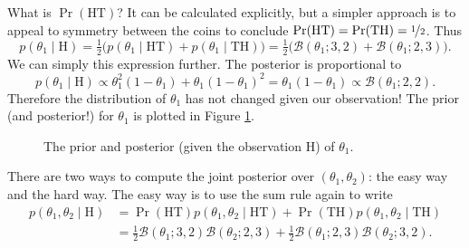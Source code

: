 \documentclass{article}
\newcommand{\given}{\mid}
\newcommand{\mc}[1]{\mathcal{#1}}
\begin{document}
What is $\Pr(\text{HT})$?  It can be calculated explicitly, but a
simpler approach is to appeal to symmetry between the coins to
conclude $\Pr(\text{HT}) = \Pr(\text{TH}) = \nicefrac{1}{2}$.  Thus
\begin{equation*}
  p(\theta_1 \given \text{H})
  =
  \tfrac{1}{2}
  \bigl(
  p(\theta_1 \given \text{HT}) +
  p(\theta_1 \given \text{TH})
  \bigr)
  =
  \tfrac{1}{2}
  \bigl(
  \mc{B}(\theta_1; 3, 2) +
  \mc{B}(\theta_1; 2, 3)
  \bigr)
  .
\end{equation*}
We can simply this expression further.  The posterior is proportional
to
\begin{equation*}
  p(\theta_1 \given \text{H})
  \propto
  \theta_1^2 (1 - \theta_1)
  +
  \theta_1 (1 - \theta_1)^2
  =
  \theta_1(1 - \theta_1)
  \propto
  \mc{B}(\theta_1; 2, 2).
\end{equation*}
Therefore the distribution of $\theta_1$ has not changed given our
observation!  The prior (and posterior!) for $\theta_1$ is plotted
in Figure \ref{problem_1_prior_1}.

\begin{figure}
  \centering
  
  \caption{The prior and posterior (given the observation H) of
    $\theta_1$.}
  \label{problem_1_prior_1}
\end{figure}

There are two ways to compute the joint posterior over $(\theta_1,
\theta_2)$: the easy way and the hard way.  The easy way is to use the
sum rule again to write
\begin{align*}
  p(\theta_1, \theta_2 \given \text{H})
  &=
  \Pr(\text{HT})
  p(\theta_1, \theta_2 \given \text{HT})
  +
  \Pr(\text{TH})
  p(\theta_1, \theta_2 \given \text{TH})
  \\
  &=
  \tfrac{1}{2}
  \mc{B}(\theta_1; 3, 2)
  \mc{B}(\theta_2; 2, 3)
  +
  \tfrac{1}{2}
  \mc{B}(\theta_1; 2, 3)
  \mc{B}(\theta_2; 3, 2).
\end{align*}
\end{document}
